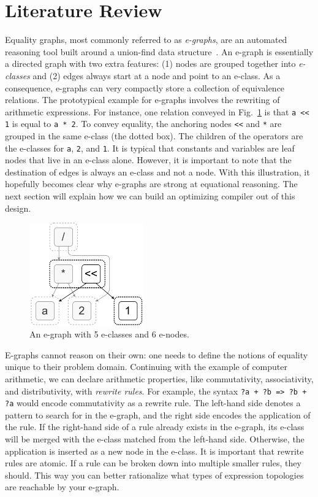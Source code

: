 \documentclass[10pt,letterpaper]{article}
\begin{document}
\section{Literature Review}\label{sec:background}

Equality graphs, most commonly referred to as \textit{e-graphs}, are an
automated reasoning tool built around a union-find data
structure~\cite{eggpaper}. An e-graph is essentially a directed graph with two
extra features: (1) nodes are grouped together into \textit{e-classes} and (2)
edges always start at a node and point to an e-class. As a consequence,
e-graphs can very compactly store a collection of equivalence relations. The
prototypical example for e-graphs involves the rewriting of arithmetic
expressions. For instance, one relation conveyed in Fig.~\ref{fig:egraph} is
that \texttt{a << 1} is equal to \texttt{a * 2}. To convey equality, the
anchoring nodes \texttt{<<} and \texttt{*} are grouped in the same e-class (the
dotted box). The children of the operators are the e-classes for \texttt{a},
\texttt{2}, and \texttt{1}. It is typical that constants and variables are leaf
nodes that live in an e-class alone. However, it is important to note that the
destination of edges is always an e-class and not a node. With this
illustration, it hopefully becomes clear why e-graphs are strong at equational
reasoning. The next section will explain how we can build an optimizing
compiler out of this design.

\begin{figure}
    \centering
    \includegraphics[width=0.44\textwidth]{img/egraph.png}
    \caption{An e-graph with 5 e-classes and 6 e-nodes.}\label{fig:egraph}
\end{figure}

E-graphs cannot reason on their own: one needs to define the notions of
equality unique to their problem domain. Continuing with the example of
computer arithmetic, we can declare arithmetic properties, like commutativity,
associativity, and distributivity, with \textit{rewrite rules}. For example,
the syntax \texttt{?a + ?b => ?b + ?a} would encode commutativity as a rewrite
rule. The left-hand side denotes a pattern to search for in the e-graph, and
the right side encodes the application of the rule. If the right-hand side of a
rule already exists in the e-graph, its e-class will be merged with the e-class
matched from the left-hand side. Otherwise, the application is inserted as a
new node in the e-class. It is important that rewrite rules are atomic. If a
rule can be broken down into multiple smaller rules, they should. This way you
can better rationalize what types of expression topologies are reachable by
your e-graph.
\end{document}
